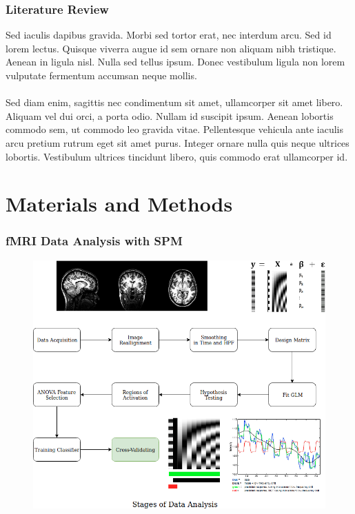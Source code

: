 \documentclass{beamer}
\begin{document}
\begin{frame}
\frametitle{Literature Review}
Sed iaculis dapibus gravida. Morbi sed tortor erat, nec interdum arcu. Sed id lorem lectus. Quisque viverra augue id sem ornare non aliquam nibh tristique. Aenean in ligula nisl. Nulla sed tellus ipsum. Donec vestibulum ligula non lorem vulputate fermentum accumsan neque mollis.\\~\\

Sed diam enim, sagittis nec condimentum sit amet, ullamcorper sit amet libero. Aliquam vel dui orci, a porta odio. Nullam id suscipit ipsum. Aenean lobortis commodo sem, ut commodo leo gravida vitae. Pellentesque vehicula ante iaculis arcu pretium rutrum eget sit amet purus. Integer ornare nulla quis neque ultrices lobortis. Vestibulum ultrices tincidunt libero, quis commodo erat ullamcorper id.
\end{frame}


\section{Materials and Methods} 

\begin{frame}
\frametitle{fMRI Data Analysis with SPM}
\begin{figure}
	\includegraphics[scale=0.3]{img2.png}
\end{figure}

\end{frame}
\end{document}

